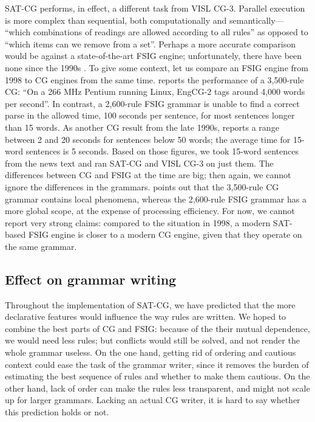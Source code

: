 SAT-CG performs, in effect, a different task from VISL CG-3.
Parallel execution is more complex than sequential, both computationally and semantically---
``which combinations of readings are allowed according to all rules'' as opposed to ``which items can we remove from a set''.
Perhaps a more accurate comparison would be against a state-of-the-art FSIG engine; 
unfortunately, there have been none since the 1990s .
To give some context, let us compare an FSIG engine from 1998 to CG engines from the same time.
\cite{voutilainen1998} reports the performance of a 3,500-rule CG: ``On a 266 MHz Pentium running Linux, EngCG-2 tags around 4,000 words per second''. In contrast, a 2,600-rule FSIG grammar is unable to find a correct parse in the allowed time, 100 seconds per sentence, for most sentences longer than 15 words.  
As another CG result from the late 1990s, \cite{tapanainen1999phd} reports a range between 2 and 20 seconds for sentences below 50 words; the average time for 15-word sentences is 5 seconds.
Based on those figures, we took  15-word sentences from the news text and ran SAT-CG and VISL CG-3 on just them.
The differences between CG and FSIG at the time are big; then again, we cannot ignore the differences in the grammars. \cite{voutilainen1998} points out that the 3,500-rule CG grammar contains local phenomena, whereas the 2,600-rule FSIG grammar has a more global scope, at the expense of processing efficiency.
For now, we cannot report very strong claims: compared to the situation in 1998, a modern SAT-based FSIG engine is closer to a modern CG engine, given that they operate on the same grammar.



\subsection{Effect on grammar writing}

Throughout the implementation of SAT-CG, we have predicted that the more declarative features would influence the way rules are written. 
We hoped to combine the best parts of CG and FSIG: because of the their mutual dependence, we would need less rules;
but conflicts would still be solved, and not render the whole grammar useless.
On the one hand, getting rid of ordering and cautious context could ease the task of the grammar writer, since it removes the burden of estimating the best sequence of rules and whether to make them cautious. On the other hand, lack of order can make the rules less transparent, and might not scale up for larger grammars.
Lacking an actual CG writer, it is hard to say whether this prediction holds or not.

